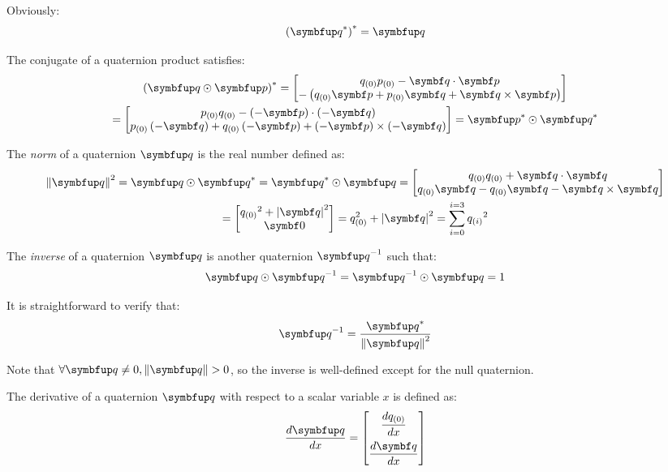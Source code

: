 Obviously:
\begin{equation} \label{E:Quat:Res:ConjConj}
\qconp{\qcon{\quat{q}}} = \quat{q} 
\end{equation}

The conjugate of a quaternion product satisfies:
\begin{multline} \label{E:Quat:Res:ConjProd}
\qconp{\quat{q} \qprod \quat{p}}
= \qcol{\qreal{q}\qreal{p} - \qvec{q} \cdot \qvec{p}}{-\left(\qreal{q}\qvec{p} + \qreal{p}\qvec{q} + \qvec{q} \times \qvec{p}\right)} \\
= \qcol{\qreal{p}\qreal{q} - (-\qvec{p}) \cdot (-\qvec{q})}{\qreal{p}\left(-\qvec{q}\right) + \qreal{q}\left(-\qvec{p}\right) + \left(-\qvec{p}\right) \times \left(-\qvec{q}\right)}
= \qcon{\quat{p}} \qprod \qcon{\quat{q}}
\end{multline}

The \emph{norm} of a quaternion $\quat{q}$ is the real number defined as:
\begin{multline} \label{E:Quat:Def:Norm}
\qnorm{\quat{q}}^2 = \quat{q} \qprod \qcon{\quat{q}} = \qcon{\quat{q}} \qprod \quat{q} = \qcol{\qreal{q}\qreal{q} + \qvec{q} \cdot \qvec{q}}{\qreal{q}\qvec{q} - \qreal{q}\qvec{q} - \qvec{q} \times \qvec{q}} \\
= \qcol{{\qreal{q}}^2 + \norm{\qvec{q}}^2}{\mcol{0}} = \qreal{q}^2 + \norm{\qvec{q}}^2 = \sum_{i=0}^{i=3}{\qcmp{q}{i}}^2
\end{multline}

The \emph{inverse} of a quaternion $\quat{q}$ is another quaternion $\inv{\quat{q}}$ such that:
\begin{equation} \label{E:Quat:Def:Inv}
\quat{q} \qprod \inv{\quat{q}} = \inv{\quat{q}} \qprod \quat{q} = 1
\end{equation}

It is straightforward to verify that:
\begin{equation} \label{E:Quat:Res:Inv}
\inv{\quat{q}} = \frac{\qcon{\quat{q}}}{\qnorm{\quat{q}}^2}
\end{equation}

Note that $\forall {\quat{q}} \neq 0, \qnorm{\quat{q}} > 0$, so the  inverse is well-defined except for the null quaternion.

The derivative of a quaternion $\quat{q}$ with respect to a scalar variable $x$ is defined as:
\begin{equation} \label{E:Quat:Def:Der}
\frac{d\quat{q}}{dx}= \qcol[2ex]{\dfrac{d\qreal{q}}{dx}}{\dfrac{d\qvec{q}}{dx}}
\end{equation}

